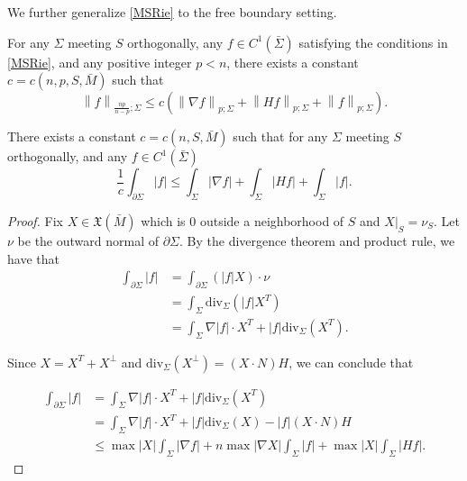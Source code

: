 We further generalize \autoref{MSRie} to the free boundary setting.

\begin{theorem} \label{MSfree}
    For any $\Sigma $ meeting $S$ orthogonally, any $f \in C^{1}(\bar{\Sigma })$ satisfying the conditions in \autoref{MSRie}, and any positive integer $p<n$, there exists a constant $c=c(n,p,S,\bar{M})$ such that 
    \[\left\| f \right\| _{\frac{np}{n-p};\Sigma } \leq c(\left\| \nabla f \right\| _{p;\Sigma }+\left\| Hf \right\| _{p;\Sigma }+\left\|  f \right\| _{p;\Sigma }).\] 
\end{theorem}

\begin{lemma}\label{BoundaryIntegral}
    There exists a constant $c=c(n,S,\bar{M})$ such that for any $\Sigma $ meeting $S$ orthogonally, and any $f \in C^1(\bar{\Sigma })$ 
    \[
        \frac{1}{c}\int_{\partial \Sigma } \left| f \right| \leq \int_{ \Sigma} \left| \nabla f \right| + \int_{ \Sigma} \left| Hf \right| + \int_{ \Sigma} \left| f \right| .   
    \]
\end{lemma}

\begin{proof}
    Fix $X \in \mathfrak{X} (\bar{M})$ which is 0 outside a neighborhood of $S$ and $X|_S=\nu _S$. Let $\nu$ be the outward normal of $\partial \Sigma $. By the divergence theorem and product rule, we have that
    \begin{equation*}
    \begin{split}
        \int_{\partial \Sigma} \left| f \right| 
        & = \int_{\partial \Sigma} \left(\left| f \right| X \right) \cdot \nu \\
    &=  \int_{\Sigma} \mathrm{div}  _{\Sigma } \left( \left| f \right| X^T \right)  \\
    &= \int_{\Sigma} \nabla \left| f \right| \cdot X^T + \left| f \right| \mathrm{div}  _{\Sigma } (X^T).
    \end{split}
    \end{equation*}

    Since $X=X^T+X^\bot $ and $\mathrm{div}_{\Sigma }(X^\bot)=(X \cdot N)H $, we can conclude that

    \begin{equation*}
        \begin{split}
            \int_{\partial \Sigma} \left| f \right| 
        &= \int_{\Sigma} \nabla \left| f \right| \cdot X^T + \left| f \right| \mathrm{div}  _{\Sigma } (X^T)\\
        &= \int_{\Sigma} \nabla \left| f \right| \cdot X^T + \left| f \right| \mathrm{div}  _{\Sigma } (X) - \left| f \right| \left(X \cdot N \right)H\\
        &\leq \max \left| X \right| \int_{\Sigma} \left| \nabla f \right| + n \max \left| \nabla X \right| \int_{\Sigma} \left| f \right| + \max \left| X \right| \int_{\Sigma} \left| Hf \right| .
        \end{split}
        \end{equation*} 
\end{proof}

